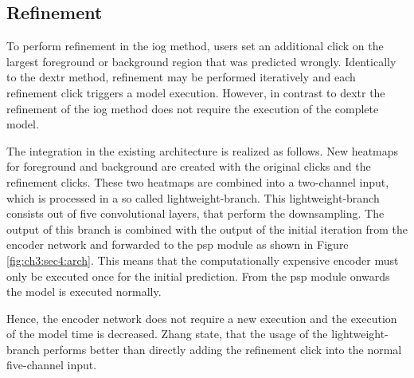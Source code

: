 \subsection{Refinement}\label{ord:ch3:sec4:subsec4}

To perform refinement in the \gls{iog} method, users set an additional click on the largest foreground or background region that was predicted wrongly.
Identically to the \gls{dextr} method, refinement may be performed iteratively and each refinement click triggers a model execution.
However, in contrast to \gls{dextr} the refinement of the \gls{iog} method does not require the execution of the complete model.

The integration in the existing architecture is realized as follows.
New heatmaps for foreground and background are created with the original clicks and the refinement clicks.
These two heatmaps are combined into a two-channel input, which is processed in a so called lightweight-branch.
This lightweight-branch consists out of five convolutional layers, that perform the downsampling.
The output of this branch is combined with the output of the initial iteration from the encoder network and forwarded to the \gls{psp} module as shown in Figure \ref{fig:ch3:sec4:arch}.
This means that the computationally expensive encoder must only be executed once for the initial prediction.
From the \gls{psp} module onwards the model is executed normally.

Hence, the encoder network does not require a new execution and the execution of the model time is decreased.
Zhang \etal state, that the usage of the lightweight-branch performs better than directly adding the refinement click into the normal five-channel input.

